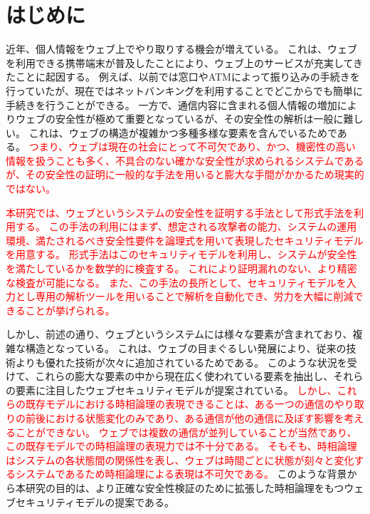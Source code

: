 \documentclass[12pt,a4paper]{jbook}
\begin{document}
\chapter{はじめに}
近年、個人情報をウェブ上でやり取りする機会が増えている。
これは、ウェブを利用できる携帯端末が普及したことにより、ウェブ上のサービスが充実してきたことに起因する。
例えば、以前では窓口やATMによって振り込みの手続きを行っていたが、現在ではネットバンキングを利用することでどこからでも簡単に手続きを行うことができる。
一方で、通信内容に含まれる個人情報の増加によりウェブの安全性が極めて重要となっているが、その安全性の解析は一般に難しい。
これは、ウェブの構造が複雑かつ多種多様な要素を含んでいるためである。
\textcolor{red}{
つまり、ウェブは現在の社会にとって不可欠であり、かつ、機密性の高い情報を扱うことも多く、不具合のない確かな安全性が求められるシステムであるが、その安全性の証明に一般的な手法を用いると膨大な手間がかかるため現実的ではない。
}

\textcolor{red}{
本研究では、ウェブというシステムの安全性を証明する手法として形式手法を利用する。
この手法の利用にはまず、想定される攻撃者の能力、システムの運用環境、満たされるべき安全性要件を論理式を用いて表現したセキュリティモデルを用意する。
形式手法はこのセキュリティモデルを利用し、システムが安全性を満たしているかを数学的に検査する。
これにより証明漏れのない、より精密な検査が可能になる。
また、この手法の長所として、セキュリティモデルを入力とし専用の解析ツールを用いることで解析を自動化でき、労力を大幅に削減できることが挙げられる。
}

しかし、前述の通り、ウェブというシステムには様々な要素が含まれており、複雑な構造となっている。
これは、ウェブの目まぐるしい発展により、従来の技術よりも優れた技術が次々に追加されているためである。
このような状況を受けて、これらの膨大な要素の中から現在広く使われている要素を抽出し、それらの要素に注目したウェブセキュリティモデルが提案されている\cite{webmodel,cookie-model}。
\textcolor{red}{
しかし、これらの既存モデルにおける時相論理の表現できることは、ある一つの通信のやり取りの前後における状態変化のみであり、ある通信が他の通信に及ぼす影響を考えることができない。
ウェブでは複数の通信が並列していることが当然であり、この既存モデルでの時相論理の表現力では不十分である。
そもそも、時相論理はシステムの各状態間の関係性を表し、ウェブは時間ごとに状態が刻々と変化するシステムであるため時相論理による表現は不可欠である。
}
このような背景から本研究の目的は、より正確な安全性検証のために拡張した時相論理をもつウェブセキュリティモデルの提案である。
\end{document}
